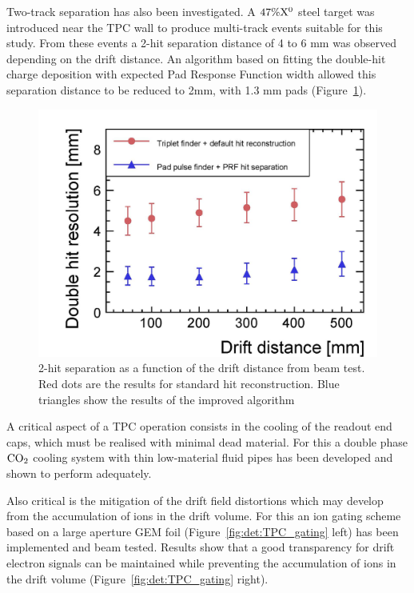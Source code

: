 \vspace{1cm}

Two-track separation has also been investigated. A $47\% \rm{X^0}$ steel target was introduced near the TPC wall to produce multi-track events suitable for this study.
From these events a 2-hit separation distance of 4 to 6 mm was observed depending on the drift distance. An algorithm based on fitting the double-hit charge deposition with expected Pad Response Function width allowed this separation distance to be reduced to 2mm, with 1.3 mm pads (Figure~\ref{fig:det:TPC_separation}).

\begin{figure}[t!]
\centering
\includegraphics[width=0.7\hsize]{Detector/fig/TPC_separation.jpg}
\caption{2-hit separation as a function of the drift distance from beam test. Red dots are the results for standard hit reconstruction. Blue triangles show the results of the improved algorithm}
\label{fig:det:TPC_separation}
\end{figure}


\vspace{1cm}
A critical aspect of a TPC operation consists in the cooling of the readout end caps, which must be realised with minimal dead material.  For this a double phase $\rm{CO}_2$ cooling system with thin low-material fluid pipes has been developed and shown to perform adequately. 

Also critical is the mitigation of the drift field distortions which may develop from the accumulation of ions in the drift volume. For this an ion gating scheme based on a large aperture GEM foil (Figure~\ref{fig:det:TPC_gating} left) has been implemented and beam tested\cite{ild:bib:TPC_gatinginbeam}.
Results show that a good transparency for drift electron signals can be maintained while preventing the accumulation of ions in the drift volume\cite{ild:bib:TPC_gatingpaper} (Figure~\ref{fig:det:TPC_gating} right).

